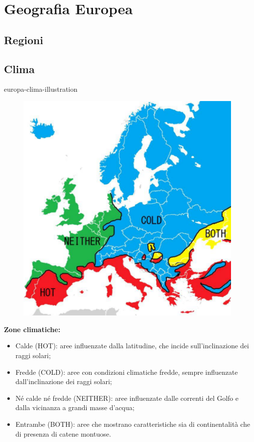 \documentclass[preview]{standalone}
\begin{document}
\genpage

\section{Geografia Europea}

\subsection{Regioni}


\subsection{Clima}

\begin{snippet}{europa-clima-illustration}
    \setlength{\intextsep}{0pt}%
    \begin{figure}
        \includegraphics[width=.5\textwidth]{resources/europa-clima.png}
    \end{figure}
    
    \textbf{Zone climatiche:}
    \begin{itemize}
        \item Calde (HOT): aree influenzate dalla latitudine, che incide
            sull'inclinazione dei raggi solari;
        \item Fredde (COLD): aree con condizioni climatiche fredde, sempre
            influenzate dall'inclinazione dei raggi solari;
        \item Né calde né fredde (NEITHER): aree influenzate dalle correnti del Golfo
            e dalla vicinanza a grandi masse d'acqua;
        \item Entrambe (BOTH): aree che mostrano caratteristiche sia di
            continentalità che di presenza di catene montuose. 
    \end{itemize}
    \wrapfill
\end{snippet}
\end{document}
